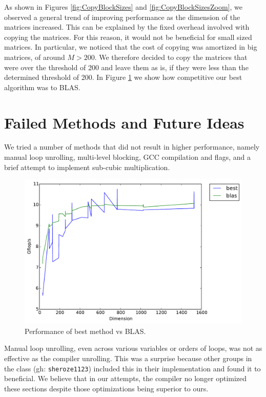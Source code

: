 \documentclass[12pt]{article}
\begin{document}
As shown in Figures \ref{fig:CopyBlockSizes} and \ref{fig:CopyBlockSizesZoom}, we observed a general trend of improving performance as the dimension of the matrices increased.
This can be explained by the fixed overhead involved with copying the matrices.
For this reason, it would not be beneficial for small sized matrices.
In particular, we noticed that the cost of copying was amortized in big matrices, of around $M>200$.
We therefore decided to copy the matrices that were over the threshold of 200 and leave them as is, if they were less than the determined threshold of 200.
In Figure \ref{fig:BestBlas} we show how competitive our best algorithm was to BLAS.

\section{Failed Methods and Future Ideas}
We tried a number of methods that did not result in higher performance, namely manual loop unrolling, multi-level blocking, GCC compilation and flags, and a brief attempt to implement sub-cubic multiplication. 

\begin{center}
\begin{figure}[h]
\includegraphics[width=16cm]{timing_blas_vs_best.pdf}
	\caption{Performance of best method vs BLAS.}
	\label{fig:BestBlas}
\end{figure}
\end{center}

Manual loop unrolling, even across various variables or orders of loops, was not as effective as the compiler unrolling.
This was a surprise because other groups in the class (gh: \texttt{sheroze1123}) included this in their implementation and found it to beneficial.
We believe that in our attempts, the compiler no longer optimized these sections despite those optimizations being superior to ours.
\end{document}
